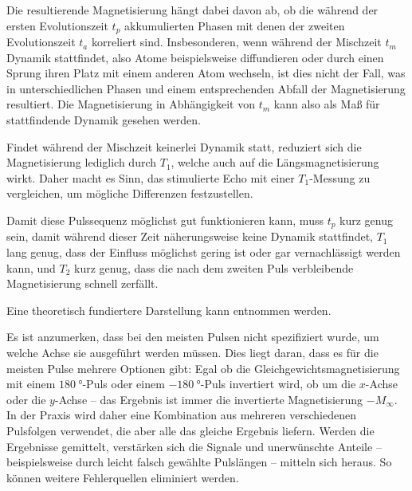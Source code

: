 Die resultierende Magnetisierung hängt dabei davon ab, ob die während der ersten Evolutionszeit $t_p$ akkumulierten Phasen mit denen der zweiten Evolutionszeit $t_a$ korreliert sind. Insbesonderen, wenn während der Mischzeit $t_m$ Dynamik stattfindet, also Atome beispielsweise diffundieren oder durch einen Sprung ihren Platz mit einem anderen Atom wechseln, ist dies nicht der Fall, was in unterschiedlichen Phasen und einem entsprechenden Abfall der Magnetisierung resultiert. Die Magnetisierung in Abhängigkeit von $t_m$ kann also als Maß für stattfindende Dynamik gesehen werden.

Findet während der Mischzeit keinerlei Dynamik statt, reduziert sich die Magnetisierung lediglich durch $T_1$, welche auch auf die Längsmagnetisierung wirkt. Daher macht es Sinn, das stimulierte Echo mit einer $T_1$-Messung zu vergleichen, um mögliche Differenzen festzustellen.

Damit diese Pulssequenz möglichst gut funktionieren kann, muss $t_p$ kurz genug sein, damit während dieser Zeit näherungsweise keine Dynamik stattfindet, $T_1$ lang genug, dass der Einfluss möglichst gering ist oder gar vernachlässigt werden kann, und $T_2$ kurz genug, dass die nach dem zweiten Puls verbleibende Magnetisierung schnell zerfällt.

Eine theoretisch fundiertere Darstellung kann \cite[insb. Kap. 6.2 und 10.2.3]{schmidt-rohr_multidimensional_1994} entnommen werden.

Es ist anzumerken, dass bei den meisten Pulsen nicht spezifiziert wurde, um welche Achse sie ausgeführt werden müssen. Dies liegt daran, dass es für die meisten Pulse mehrere Optionen gibt: Egal ob die Gleichgewichtsmagnetisierung mit einem $\SI{180}{\degree}$-Puls oder einem $\SI{-180}{\degree}$-Puls invertiert wird, ob um die $x$-Achse oder die $y$-Achse -- das Ergebnis ist immer die invertierte Magnetisierung $-M_\infty$. In der Praxis wird daher eine Kombination aus mehreren verschiedenen Pulsfolgen verwendet, die aber alle das gleiche Ergebnis liefern. Werden die Ergebnisse gemittelt, verstärken sich die Signale und unerwünschte Anteile -- beispielsweise durch leicht falsch gewählte Pulslängen -- mitteln sich heraus. So können weitere Fehlerquellen eliminiert werden.


